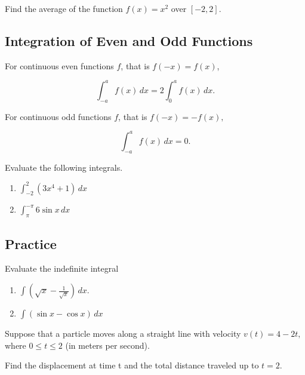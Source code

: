 \begin{example}

Find the average of the function \(f(x)=x^2\) over \([-2, 2]\).

\end{example}
\vspace*{6\baselineskip}

\hypertarget{integration-of-even-and-odd-functions}{%
\subsection{Integration of Even and Odd
Functions}\label{integration-of-even-and-odd-functions}}

For continuous even functions \(f\), that is \(f(-x)=f(x)\),

\[\displaystyle \int^a_{-a}f(x)\,dx=2\int^a_0f(x)\,dx.\]

For continuous odd functions \(f\), that is \(f(-x)=-f(x),\)

\[\displaystyle \int^a_{-a}f(x)\,dx=0.\]

\begin{example}

Evaluate the following integrals.

\begin{enumerate}
\item
  \(\displaystyle \int^2_{-2}(3x^4+1)\,dx\)
\item
  \(\displaystyle \int_\pi^{-\pi} 6\sin x\, dx\)
\end{enumerate}

\end{example}

\subsection{Practice}

\begin{exercise}

Evaluate the indefinite integral

\begin{enumerate}
\item
  \(\displaystyle \int (\sqrt{x}-\frac{1}{\sqrt{x}})\,dx.\)
\item
  \(\displaystyle \int(\sin x-\cos x)\,dx\)
\end{enumerate}

\end{exercise}

\begin{exercise}

Suppose that a particle moves along a straight line with velocity
\(v(t)=4-2t,\) where \(0\leq t\leq 2\) (in meters per second).

Find the displacement at time t and the total distance traveled up to
\(t=2\).

\end{exercise}
\vspace*{6\baselineskip}


